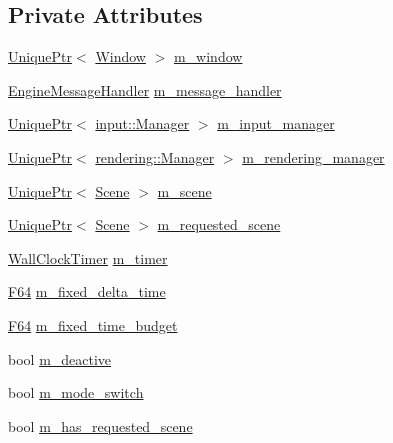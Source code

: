 \subsection*{Private Attributes}
\begin{DoxyCompactItemize}
\item 
\hyperlink{namespacemage_a3316d7143a973e37adf1110f2e80ca31}{Unique\+Ptr}$<$ \hyperlink{classmage_1_1_window}{Window} $>$ \hyperlink{classmage_1_1_engine_a8b710b9c37a48caad05896102c4b6980}{m\+\_\+window}
\item 
\hyperlink{classmage_1_1_engine_message_handler}{Engine\+Message\+Handler} \hyperlink{classmage_1_1_engine_a8359f22543fa6e39c948411e3023c397}{m\+\_\+message\+\_\+handler}
\item 
\hyperlink{namespacemage_a3316d7143a973e37adf1110f2e80ca31}{Unique\+Ptr}$<$ \hyperlink{classmage_1_1input_1_1_manager}{input\+::\+Manager} $>$ \hyperlink{classmage_1_1_engine_a33db04e6d27802054769ff6a30911261}{m\+\_\+input\+\_\+manager}
\item 
\hyperlink{namespacemage_a3316d7143a973e37adf1110f2e80ca31}{Unique\+Ptr}$<$ \hyperlink{classmage_1_1rendering_1_1_manager}{rendering\+::\+Manager} $>$ \hyperlink{classmage_1_1_engine_ae870ec5b532a21112500f0f0f03e9b55}{m\+\_\+rendering\+\_\+manager}
\item 
\hyperlink{namespacemage_a3316d7143a973e37adf1110f2e80ca31}{Unique\+Ptr}$<$ \hyperlink{classmage_1_1_scene}{Scene} $>$ \hyperlink{classmage_1_1_engine_a2d4037208a0529838c81ccea08c9de11}{m\+\_\+scene}
\item 
\hyperlink{namespacemage_a3316d7143a973e37adf1110f2e80ca31}{Unique\+Ptr}$<$ \hyperlink{classmage_1_1_scene}{Scene} $>$ \hyperlink{classmage_1_1_engine_a45160eecbdcbebcf269436505342db54}{m\+\_\+requested\+\_\+scene}
\item 
\hyperlink{namespacemage_a06f4035ef59f07892e594bf1178a108a}{Wall\+Clock\+Timer} \hyperlink{classmage_1_1_engine_a539cff5bf8252ef28b994be49e9e6b7c}{m\+\_\+timer}
\item 
\hyperlink{namespacemage_ad26233bbec640deda836e572c1a23708}{F64} \hyperlink{classmage_1_1_engine_a95557e1b6cba52b393c94d80d80bea4c}{m\+\_\+fixed\+\_\+delta\+\_\+time}
\item 
\hyperlink{namespacemage_ad26233bbec640deda836e572c1a23708}{F64} \hyperlink{classmage_1_1_engine_ad46dd72279d9d86b96d1b907575765e9}{m\+\_\+fixed\+\_\+time\+\_\+budget}
\item 
bool \hyperlink{classmage_1_1_engine_ab8a4b0157403708ae7d1d018a95b4c63}{m\+\_\+deactive}
\item 
bool \hyperlink{classmage_1_1_engine_aa5cb2e0b7bb2c4a9020e79ab832ee221}{m\+\_\+mode\+\_\+switch}
\item 
bool \hyperlink{classmage_1_1_engine_a96089c745442208679ea2e18cc6a6097}{m\+\_\+has\+\_\+requested\+\_\+scene}
\end{DoxyCompactItemize}



